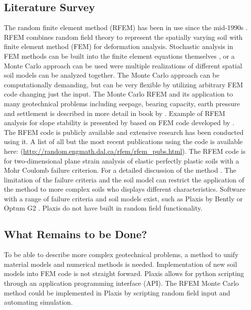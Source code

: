 \subsection*{Literature Survey}
The random finite element method (RFEM) has been in use since the mid-1990s \citep*[e.g, see][]{griffiths1993seepage}. RFEM combines random field theory to represent the spatially varying soil with finite element method (FEM) for deformation analysis. Stochastic analysis in FEM methods can be built into the finite element equations themselves \citep*[e.g., see][]{vanmarcke1983stochastic}, 
or a Monte Carlo approach can be used were multiple realizations of different spatial soil models can be analyzed together. 
The Monte Carlo approach can be computationally demanding, but can be very flexible by utilizing arbitrary FEM code changing just the input. 
The Monte Carlo RFEM and its application to many geotechnical problems including seepage, bearing capacity, earth pressure and settlement is described in more detail in book by \citet*{fenton2008risk}.
Example of RFEM analysis for slope stability is presented by \citep*[see][Chapter 13]{fenton2008risk} based on FEM code developed by \citet*{smith2013programming}. The RFEM code is publicly available and extensive research has been conducted using it. A list of all but the most recent publications using the code is available here: (\url{http://random.engmath.dal.ca/rfem/rfem_pubs.html}). 
The RFEM code is for two-dimensional plane strain analysis of elastic perfectly plastic soils with a Mohr Coulomb failure criterion. For a detailed discussion of the method \citep*[e.g, see][]{griffiths1999slope}.
The limitation of the failure criteria and the soil model can restrict the application of the method to more complex soils who displays different characteristics. Software with a range of failure criteria and soil models exist, such as Plaxis by Bently \citep{brinkgreve2010plaxis} or Optum G2 \citep{krabbenhoft2016optum}. 
Plaxis do not have built in random field functionality. 


\subsection*{What Remains to be Done?}
To be able to describe more complex geotechnical problems, a method to unify material models and numerical methods is needed. Implementation of new soil models into FEM code is not straight forward. 
Plaxis allows for python scripting through an application programming interface (API). 
The RFEM Monte Carlo method could be implemented in Plaxis by scripting random field input and automating simulation.


